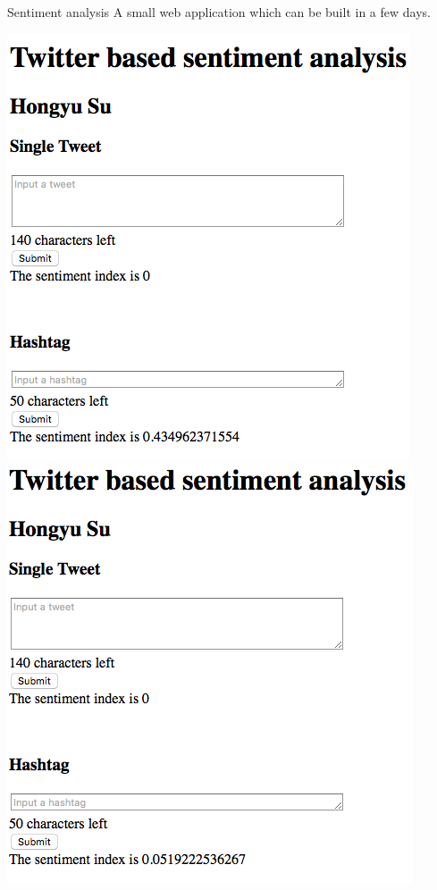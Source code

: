 \documentclass[first=dgreen,second=purple,logo=yellowexc]{aaltoslides}
\begin{document}
\iffalse
\begin{frame}{Sentiment analysis}
	A small web application which can be built in a few days.
	\begin{center}
		\includegraphics[scale=0.3]{./plots/norway.png}
		\includegraphics[scale=0.3]{./plots/finland.png}
	\end{center}
\end{frame}
\end{document}
